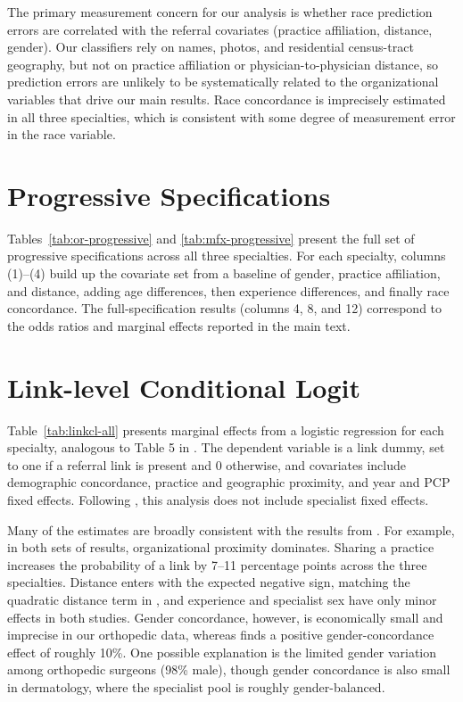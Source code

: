 \documentclass[12pt]{article}
\begin{document}
The primary measurement concern for our analysis is whether race prediction errors are correlated with the referral covariates (practice affiliation, distance, gender). Our classifiers rely on names, photos, and residential census-tract geography, but not on practice affiliation or physician-to-physician distance, so prediction errors are unlikely to be systematically related to the organizational variables that drive our main results. Race concordance is imprecisely estimated in all three specialties, which is consistent with some degree of measurement error in the race variable.


\section{Progressive Specifications}
\label{sec:progressive}

Tables~\ref{tab:or-progressive} and \ref{tab:mfx-progressive} present the full set of progressive specifications across all three specialties. For each specialty, columns (1)--(4) build up the covariate set from a baseline of gender, practice affiliation, and distance, adding age differences, then experience differences, and finally race concordance. The full-specification results (columns 4, 8, and 12) correspond to the odds ratios and marginal effects reported in the main text.


\section{Link-level Conditional Logit}
\label{sec:linkcl}

Table~\ref{tab:linkcl-all} presents marginal effects from a logistic regression for each specialty, analogous to Table 5 in \cite{zeltzer2020}. The dependent variable is a link dummy, set to one if a referral link is present and 0 otherwise, and covariates include demographic concordance, practice and geographic proximity, and year and PCP fixed effects. Following \cite{zeltzer2020}, this analysis does not include specialist fixed effects.

Many of the estimates are broadly consistent with the results from \cite{zeltzer2020}. For example, in both sets of results, organizational proximity dominates. Sharing a practice increases the probability of a link by 7--11 percentage points across the three specialties. Distance enters with the expected negative sign, matching the quadratic distance term in \cite{zeltzer2020}, and experience and specialist sex have only minor effects in both studies. Gender concordance, however, is economically small and imprecise in our orthopedic data, whereas \cite{zeltzer2020} finds a positive gender-concordance effect of roughly 10\%. One possible explanation is the limited gender variation among orthopedic surgeons (98\% male), though gender concordance is also small in dermatology, where the specialist pool is roughly gender-balanced.
\end{document}
